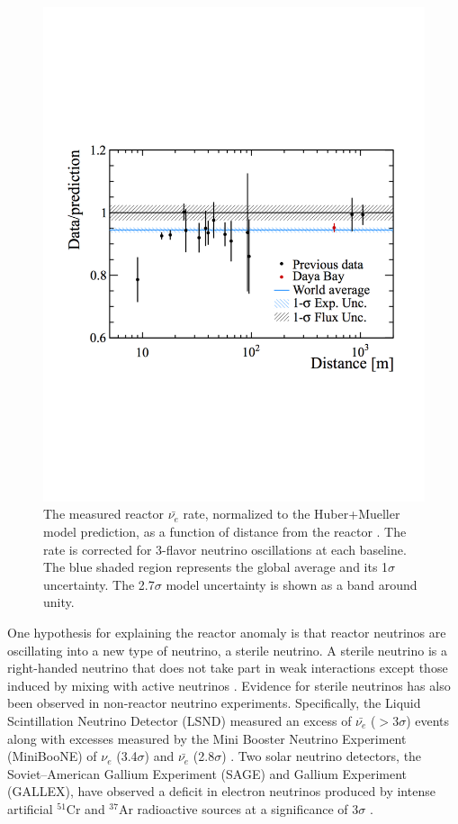 \begin{figure}[t]
	\centering
	\includegraphics[width=0.6\linewidth]{tex/3-reactorneutrinos-images/WorldAvgFlux}
	\caption[World average of reactor $\bar{\nu_{e}}$ flux. ]{The measured reactor $\bar{\nu_{e}}$ rate, normalized to the Huber+Mueller model prediction, as a function of distance from the reactor \cite{DayaBayFlux2018}. The rate is corrected for 3-flavor neutrino oscillations at each baseline. The blue shaded region represents the global average and its 1$\sigma$ uncertainty. The 2.7$\sigma$ model uncertainty is shown as a band around unity.}
	\label{fig:worldavgflux}
\end{figure}

One hypothesis for explaining the reactor anomaly is that reactor neutrinos are oscillating into a new type of neutrino, a sterile neutrino. 
A sterile neutrino is a right-handed neutrino that does not take part in weak interactions except those induced by mixing with active neutrinos \cite{Abazajian:2012ys}. 
Evidence for sterile neutrinos has also been observed in non-reactor neutrino experiments. 
Specifically, the Liquid Scintillation Neutrino Detector (LSND)  measured an excess of $\bar{\nu_{e}}$ ($>$3$\sigma$) events \cite{Aguilar:2001ty} along with excesses measured by the Mini Booster Neutrino Experiment (MiniBooNE) of $\nu_{e}$ (3.4$\sigma$) and $\bar{\nu_{e}}$ (2.8$\sigma$) \cite{Aguilar-Arevalo:2013pmq}.
Two solar neutrino detectors, the Soviet–American Gallium Experiment (SAGE) and Gallium Experiment (GALLEX), have observed a deficit in electron neutrinos produced by intense artificial $^{51}$Cr and $^{37}$Ar radioactive sources at a significance of 3$\sigma$ \cite{Giunti:2010zu}.

